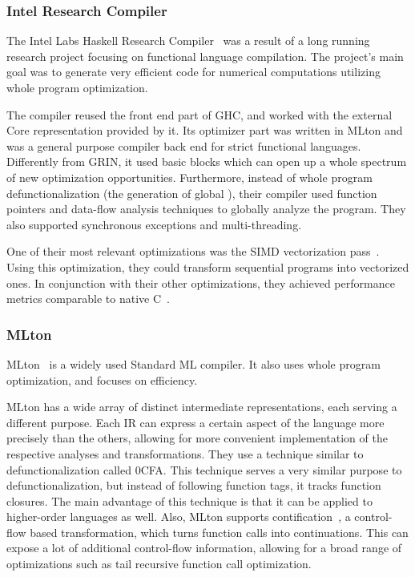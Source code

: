 \documentclass[main.tex]{subfiles}
\begin{document}
	\subsubsection{Intel Research Compiler}
	
	The Intel Labs Haskell Research Compiler~\cite{hrc} was a result of a long running research project focusing on functional language compilation. The project's main goal was to generate very efficient code for numerical computations utilizing whole program optimization.
	
	The compiler reused the front end part of GHC, and worked with the external Core representation provided by it. Its optimizer part was written in MLton and was a general purpose compiler back end for strict functional languages. Differently from GRIN, it used basic blocks which can open up a whole spectrum of new optimization opportunities. Furthermore, instead of whole program defunctionalization (the generation of global ), their compiler used function pointers and data-flow analysis techniques to globally analyze the program. They also supported synchronous exceptions and multi-threading.
	
	One of their most relevant optimizations was the SIMD vectorization pass~\cite{hrc-simd}. Using this optimization, they could transform sequential programs into vectorized ones. In conjunction with their other optimizations, they achieved performance metrics comparable to native C~\cite{haskell-gap}.
	
	\subsubsection{MLton}
	
	MLton~\cite{mlton} is a widely used Standard ML compiler. It also uses whole program optimization, and focuses on efficiency.
	
	MLton has a wide array of distinct intermediate representations, each serving a different purpose. Each IR can express a certain aspect of the language more precisely than the others, allowing for more convenient implementation of the respective analyses and transformations. They use a technique similar to defunctionalization called 0CFA. This technique serves a very similar purpose to defunctionalization, but instead of following function tags, it tracks function closures. The main advantage of this technique is that it can be applied to higher-order languages as well. Also, MLton supports contification~\cite{contification}, a control-flow based transformation, which turns function calls into continuations. This can expose a lot of additional control-flow information, allowing for a broad range of optimizations such as tail recursive function call optimization.
	
\end{document}
